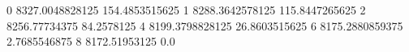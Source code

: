 0 8327.0048828125 154.4853515625
1 8288.3642578125 115.8447265625
2 8256.77734375 84.2578125
4 8199.3798828125 26.8603515625
6 8175.2880859375 2.7685546875
8 8172.51953125 0.0

